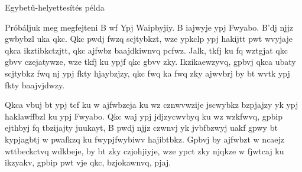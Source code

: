 \documentclass[12 pt]{beamer}
\begin{document}
\begin{frame}{Egybetű-helyettesítés példa}
  \begin{exampleblock}{Próbáljuk meg megfejteni}
    B wf Ypj Waipbyjiy. B iajwyje ypj Fwyabo. B'dj njjz gwbybzl uka qkc. Qkc pwdj fwzq scjtybkzt, wze ypkclp ypj hakijtt pwt wvyjaje qkca ikztibkctzjtt, qkc ajfwbz baajdkiwnvq pcfwz. Jalk, tkfj ku fq wztgjat qkc gbvv czejatywze, wze tkfj ku ypjf qkc gbvv zky. Ikzikaewzyvq, gpbvj qkca ubaty scjtybkz fwq nj ypj fkty hjaybzjzy, qkc fwq ka fwq zky ajwvbrj by bt wvtk ypj fkty baajvjdwzy.

Qkca vbuj bt ypj tcf ku w ajfwbzeja ku wz cznwvwzije jscwybkz bzpjajzy yk ypj haklawffbzl ku ypj Fwyabo. Qkc waj ypj jdjzycwvbyq ku wz wzkfwvq, gpbip ejthbyj fq tbzijajty juukayt, B pwdj njjz czwnvj yk jvbfbzwyj uakf gpwy bt kypjagbtj w pwafkzq ku fwypjfwybiwv hajibtbkz. Gpbvj by ajfwbzt w ncaejz wttbeckctvq wdkbeje, by bt zky czjohjiyje, wze ypct zky njqkze w fjwtcaj ku ikzyakv, gpbip pwt vje qkc, bzjokawnvq, pjaj.
  \end{exampleblock}
\end{frame}

\end{document}
